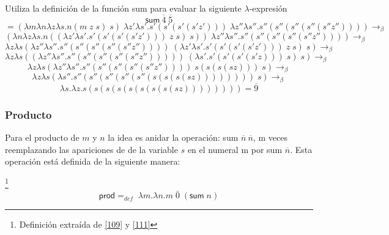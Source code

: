         \begin{exercise}
            Utiliza la definición de la función \textsf{sum} para evaluar la siguiente  $\lambda$-expresión
            \[
                \textsf{sum}\  \overline{4} \; \overline{5} 
            \]
            \[
                = (\lambda m\lambda n\lambda z\lambda s.n(m \; z \; s) \; s) \; \lambda z'\lambda s'.s'(s'(s'(s'z'))) \; \lambda z''\lambda s''.s''(s''(s''(s''(s''z'')))) \rightarrow_\beta 
            \]
            \[
                (\lambda n\lambda z\lambda s.n((\lambda z'\lambda s'.s'(s'(s'(s'z'))) \; z \; s) \; s)) \; \lambda z''\lambda s''.s''(s''(s''(s''(s''z'')))) \rightarrow_\beta 
            \]
            \[
                \lambda z\lambda s(\lambda z''\lambda s''.s''(s''(s''(s''(s''z'')))) \; (\lambda z'\lambda s'.s'(s'(s'(s'z'))) \; z \; s) \; s) \rightarrow_\beta
            \]
            \[
                \lambda z\lambda s((\lambda z''\lambda s''.s''(s''(s''(s''(s''z''))))) \; (\lambda s'.s'(s'(s'(s'z)))  \; s) \; s) \rightarrow_\beta
            \]
            \[
                \lambda z\lambda s(\lambda z''\lambda s''.s''(s''(s''(s''(s''z'')))) \; s(s(s(sz))) \; s) \rightarrow_\beta
            \]
            \[
                \lambda z\lambda s(\lambda s''.s''(s''(s''(s''(s''(s(s(s(sz)))))))) \; s) \rightarrow_\beta
            \]
            \[
                \lambda s.\lambda z .s(s(s(s(s(s(s(s(sz)))))))) = \overline{9}
            \]
        \end{exercise}

        \subsubsection{Producto}
        Para el producto de $m$ y $n$ la idea es anidar la operación: \textsf{sum} $\overline{n}\ \overline{n}$, m veces reemplazando las apariciones de de la variable $s$ en el numeral m por \textsf{sum} $\overline{n}$. Esta operación está definida de la siguiente manera:

        \begin{definition}\footnote{Definición extraída de \hyperlink{109}{[109]} y  \hyperlink{111}{[111]}}
            $$\textsf{prod} =_{def}  \; \lambda m.\lambda n.m\; \bar{0} \; (\textsf{sum}\;n)$$
        \end{definition}

